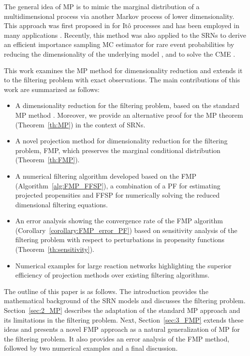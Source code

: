 The general idea of \ac{MP} is to mimic the marginal distribution of a multidimensional process via another Markov process of lower dimensionality. This approach was first proposed in \cite{Gyongy1986MP} for It\^o processes and has been employed in many applications \cite{piterbarg2006markovian, Bayer2019Implied, Bentata2009Mimicking}. Recently, this method was also applied to the \acp{SRN} to derive an efficient importance sampling \ac{MC} estimator for rare event probabilities by reducing the dimensionality of the underlying model \cite{Hammouda2023MP}, and to solve the \ac{CME} \cite{ocal2023model}. 

This work examines the \ac{MP} method for dimensionality reduction and extends it to the filtering problem with exact observations. The main contributions of this work are summarized as follows:
\begin{itemize}
    \item A dimensionality reduction for the filtering problem, based on the standard \ac{MP} method \cite{Hammouda2023MP}. Moreover, we provide an alternative proof for the \ac{MP} theorem (Theorem~\ref{th:MP}) in the context of \acp{SRN}.
    \item A novel projection method for dimensionality reduction for the filtering problem, \ac{FMP}, which  preserves the marginal conditional distribution (Theorem~\ref{th:FMP}).
    \item A numerical filtering algorithm developed based on the \ac{FMP} (Algorithm~\ref{alg:FMP_FFSP}), a combination of a \ac{PF} for estimating projected propensities and \ac{FFSP} for numerically solving the reduced dimensional filtering equations.
    \item An error analysis showing the convergence rate of the \ac{FMP} algorithm (Corollary~\ref{corollary:FMP_error_PF}) based on sensitivity analysis of the filtering problem with respect to perturbations in propensity functions (Theorem~\ref{th:sensitivity}).
    \item Numerical examples for large reaction networks highlighting the superior efficiency of projection methods over existing filtering algorithms.
\end{itemize}

The outline of this paper is as follows. The introduction provides the mathematical background of the \ac{SRN} models and discusses the filtering problem. Section~\ref{sec:2_MP} describes the adaptation of the standard \ac{MP} approach and its limitations in the filtering problem. Next, Section~\ref{sec:3_FMP} extends these ideas and presents a novel \ac{FMP} approach as a natural generalization of \ac{MP} for the filtering problem. It also provides an error analysis of the \ac{FMP} method, followed by two numerical examples  and a final discussion.


